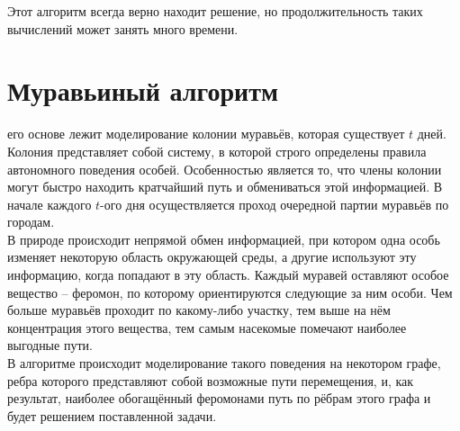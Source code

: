 Этот алгоритм всегда верно находит решение, но продолжительность таких вычислений может занять много времени.\\

\section{Муравьиный алгоритм}
 его основе лежит моделирование колонии муравьёв, которая существует $t$ дней. Колония представляет собой систему, в которой строго определены правила автономного поведения особей. Особенностью является то, что члены колонии могут быстро находить кратчайший путь и обмениваться этой информацией. В начале каждого $t$-ого дня осуществляется проход очередной партии муравьёв по городам. \\

В природе происходит непрямой обмен информацией, при котором одна особь изменяет некоторую область окружающей среды, а другие используют эту информацию, когда попадают в эту область. Каждый муравей оставляют особое вещество -- феромон, по которому ориентируются следующие за ним особи. Чем больше муравьёв проходит по какому-либо участку, тем выше на нём концентрация этого вещества, тем самым насекомые помечают наиболее выгодные пути. \\

В алгоритме происходит моделирование такого поведения на некотором графе, ребра которого представляют собой возможные пути перемещения, и, как результат, наиболее обогащённый феромонами путь по рёбрам этого графа и будет решением поставленной задачи.\\

